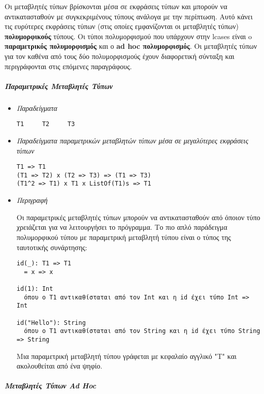 \documentclass[diploma]{softlab-thesis}
\begin{document}
Οι μεταβλητές τύπων βρίσκονται μέσα σε εκφράσεις τύπων και μπορούν να
αντικατασταθούν με συγκεκριμένους τύπους ανάλογα με την περίπτωση. Αυτό
κάνει τις ευρύτερες εκφράσεις τύπων (στις οποίες εμφανίζονται οι μεταβλητές
τύπων) \textbf{πολυμορφικούς} τύπους. Οι τύποι πολυμορφισμού που υπάρχουν
στην lcases είναι o \textbf{παραμετρικός πολυμορφισμός} και ο \textbf{ad hoc
πολυμορφισμός}. Οι μεταβλητές τύπων για τον καθένα από τους δύο πολυμορφισμούς
έχουν διαφορετική σύνταξη και περιγράφονται στις επόμενες παραγράφους.

\subparagraph{Παραμετρικές Μεταβλητές Τύπων}

\begin{itemize}
\item \textit{Παραδείγματα}
\begin{verbatim}
T1     T2     T3
\end{verbatim}

\item
\textit{
Παραδείγματα παραμετρικών μεταβλητών τύπων μέσα σε μεγαλύτερες εκφράσεις
τύπων
}
\begin{verbatim}
T1 => T1
(T1 => T2) x (T2 => T3) => (T1 => T3)
(T1^2 => T1) x T1 x ListOf(T1)s => T1
\end{verbatim}

\item \textit{Περιγραφή}

Οι παραμετρικές μεταβλητές τύπων μπορούν να αντικατασταθούν από όποιον τύπο
χρειάζεται για να λειτουργήσει το πρόγραμμα. Το πιο απλό παράδειγμα
πολυμορφικού τύπου με παραμετρική μεταβλητή τύπου είναι ο τύπος της
ταυτοτικής συνάρτησης:
\begin{verbatim}
id(_): T1 => T1
  = x => x

id(1): Int
  όπου ο T1 αντικαθίσταται από τον Int και η id έχει τύπο Int => Int

id("Hello"): String
  όπου ο T1 αντικαθίσταται από τον String και η id έχει τύπο String => String
\end{verbatim}

Μια παραμετρική μεταβλητή τύπου γράφεται με κεφαλαίο αγγλικό "T" και
ακολουθείται από ένα ψηφίο.

\end{itemize}

\newpage
\subparagraph{Μεταβλητές Τύπων Ad Hoc}
\end{document}
